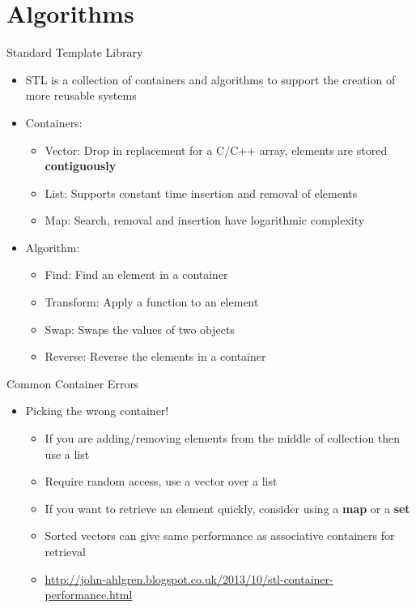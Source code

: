 \part{Algorithms}
\frame{\partpage}

\begin{frame}{Standard Template Library}
	\begin{itemize}
		\pause \item STL is a collection of containers and algorithms to support the creation of more reusable systems
		\pause \item Containers:
		\begin{itemize}
			\pause \item Vector: Drop in replacement for a C/C++ array, elements are stored \textbf{contiguously} 
			\pause \item List: Supports constant time insertion and removal of elements
			\pause \item Map: Search, removal and insertion have logarithmic complexity
		\end{itemize}
		\pause \item Algorithm:
		\begin{itemize}
			\pause \item Find: Find an element in a container
			\pause \item Transform: Apply a function to an element
			\pause \item Swap: Swaps the values of two objects
			\pause \item Reverse: Reverse the elements in a container 
		\end{itemize}
	\end{itemize}
\end{frame}

\begin{frame}{Common Container Errors}
	\begin{itemize}
		\pause \item Picking the wrong container!
		\begin{itemize}
			\pause \item If you are adding/removing elements from the middle of collection then use a list 
			\pause \item Require random access, use a vector over a list
			\pause \item If you want to retrieve an element quickly, consider using a \textbf{map} or a \textbf{set}
			\pause \item Sorted vectors can give same performance as associative containers for retrieval   
			\pause \item \url{http://john-ahlgren.blogspot.co.uk/2013/10/stl-container-performance.html}
		\end{itemize}
	\end{itemize}
\end{frame}

